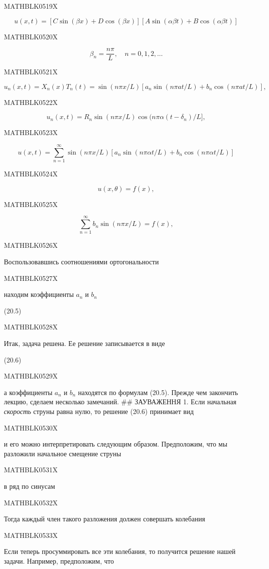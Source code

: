 \documentclass[
  ukrainian,
]{article}
\begin{document}
MATHBLK0519X

\[
u(x, t) = [C \sin(\beta x) + D \cos(\beta x)][A \sin(\alpha \beta t) + B \cos(\alpha \beta t)]
\]

MATHBLK0520X

\[
\beta_n = \frac{n\pi}{L}, \quad n = 0, 1, 2, \ldots
\]

MATHBLK0521X

\[
u_n(x, t) = X_n(x) T_n(t) = \sin(n\pi x/L) [a_n \sin(n\pi at/L) + b_n \cos(n\pi at/L)],
\]

MATHBLK0522X

\[
u_n(x, t) = R_n \sin(n\pi x/L) \cos(n\pi\alpha (t - \delta_n)/L],
\]

MATHBLK0523X

\[
u(x, t) = \sum_{n=1}^{\infty} \sin(n\pi x/L) \left[ a_n \sin(n\pi \alpha t/L) + b_n \cos(n\pi \alpha t/L) \right]
\]

MATHBLK0524X

\[
u(x, \theta) = f(x),
\]

MATHBLK0525X

\[
\sum_{n=1}^{\infty} b_n \sin(n\pi x/L) = f(x),
\]

MATHBLK0526X

Воспользовавшись соотношениями ортогональности

MATHBLK0527X

находим коэффициенты \(a_n\) и \(b_n\)

(20.5)

MATHBLK0528X

Итак, задача решена. Ее решение записывается в виде

(20.6)

MATHBLK0529X

а коэффициенты \(a_n\) и \(b_n\) находятся по формулам (20.5). Прежде
чем закончить лекцию, сделаем несколько замечаний. \#\# ЗАУВАЖЕННЯ 1.
Если начальная \emph{скорость} струны равна нулю, то решение (20.6)
принимает вид

MATHBLK0530X

и его можно интерпретировать следующим образом. Предположим, что мы
разложили начальное смещение струны

MATHBLK0531X

в ряд по синусам

MATHBLK0532X

Тогда каждый член такого разложения должен совершать колебания

MATHBLK0533X

Если теперь просуммировать все эти колебания, то получится решение нашей
задачи. Например, предположим, что
\end{document}
